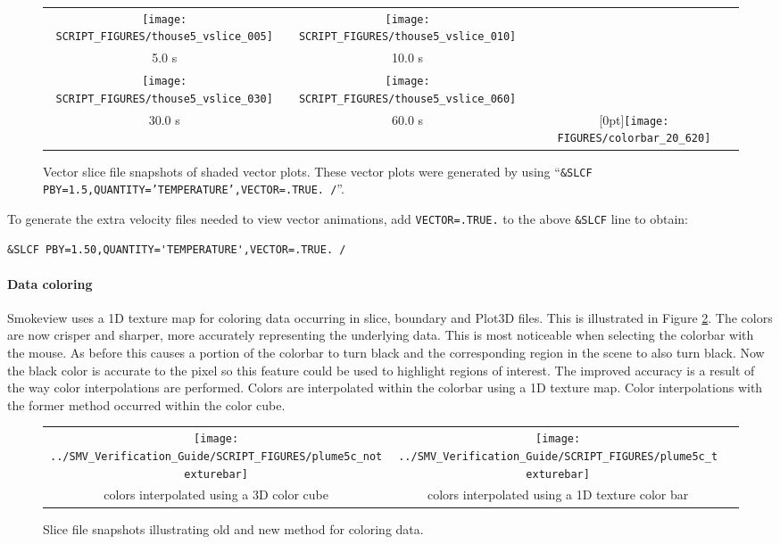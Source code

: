 \documentclass[11pt,twoside]{book}
\begin{document}
\begin{figure}[\figoptions]
\begin{center}
\begin{tabular}{ccc}
\texttt{[image: SCRIPT\_FIGURES/thouse5\_vslice\_005]}&
\texttt{[image: SCRIPT\_FIGURES/thouse5\_vslice\_010]}\\
5.0 s&10.0 s\\
\texttt{[image: SCRIPT\_FIGURES/thouse5\_vslice\_030]}&
\texttt{[image: SCRIPT\_FIGURES/thouse5\_vslice\_060]}\\
30.0 s&60.0 s
&\raisebox{0.0ex}[0pt]{\texttt{[image: FIGURES/colorbar\_20\_620]}}\\
\end{tabular}
\end{center}
\caption [Vector slice file snapshots of shaded vector plots.]
{Vector slice file snapshots of shaded vector plots. These vector
plots were generated by using ``{\tt \&SLCF
PBY=1.5,QUANTITY='TEMPERATURE',VECTOR=.TRUE. /}''.}
\label{figvslice}%
\end{figure}

To generate the extra velocity files needed to view vector
animations, add {\tt VECTOR=.TRUE.} to the above {\tt \&SLCF} line
to obtain:
\begin{lstlisting}
&SLCF PBY=1.50,QUANTITY='TEMPERATURE',VECTOR=.TRUE. /
\end{lstlisting}

\paragraph{Data coloring}Smokeview uses a 1D texture map for coloring data occurring in
slice, boundary and Plot3D files. This is illustrated in Figure
\ref{fignewslice}.  The colors are now crisper and sharper, more
accurately representing the underlying data. This is most
noticeable when selecting the colorbar with the mouse. As before
this causes a portion of the colorbar to turn black and the
corresponding region in the scene to also turn black.  Now the
black color is accurate to the pixel so this feature could be used
to highlight regions of interest. The improved accuracy is a
result of the way color interpolations are performed.  Colors
are interpolated within the colorbar using a 1D texture map.  Color interpolations with
the former method occurred within the color cube.

\begin{figure}[\figoptions]
\begin{center}
\begin{tabular}{ccc}
\texttt{[image: ../SMV\_Verification\_Guide/SCRIPT\_FIGURES/plume5c\_notexturebar]}&
\texttt{[image: ../SMV\_Verification\_Guide/SCRIPT\_FIGURES/plume5c\_texturebar]}\\
colors interpolated using a 3D color cube&colors interpolated using a 1D texture color bar\\
\end{tabular}
\caption [Slice file snapshots illustrating old and new method for
coloring data.] {Slice file snapshots illustrating old and new
method for coloring data.}
\label{fignewslice}%
\end{center}
\end{figure}
\end{document}
